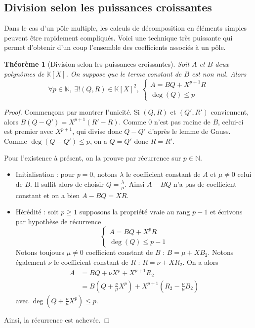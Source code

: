 \documentclass[french]{book}
\newcommand{\N}{\mathbb{N}}
\theoremstyle{plain}
\newtheorem{thm}{Théorème}[chapter]
\theoremstyle{definition}
\theoremstyle{remark}
\begin{document}
\subsection{Division selon les puissances croissantes}
Dans le cas d'un pôle multiple, les calculs de décomposition en éléments simples peuvent être rapidement compliqués. Voici une technique très puissante qui permet d'obtenir d'un coup l'ensemble des coefficients associés à un pôle.
\begin{thm}[Division selon les puissances croissantes]
	Soit $A$ et $B$ deux polynômes de $\mathbb{K}[X]$. On suppose que le terme constant de $B$ est non nul. Alors $$\forall p\in\mathbb{N},\ \exists!(Q,R)\in\mathbb{K}[X]^{2},\ \begin{cases}A=BQ+X^{p+1}R\\ \deg(Q)\le p\end{cases}$$
\end{thm}
\begin{proof}
	Commençons par montrer l'unicité. Si $(Q,R)$ et $(Q',R')$ conviennent, alors $B(Q-Q')=X^{p+1}(R'-R)$. Comme $0$ n'est pas racine de $B$, celui-ci est premier avec $X^{p+1}$, qui divise donc $Q-Q'$ d'après le lemme de Gauss. Comme $\deg(Q-Q')\leqslant p$, on a $Q=Q'$ donc $R=R'$. \\ \par Pour l'existence à présent, on la prouve par récurrence sur $p\in\N$.
	\begin{itemize}
		\item Initialisation : pour $p=0$, notons $\lambda$ le coefficient constant de $A$ et $\mu\neq 0$ celui de $B$. Il suffit alors de choisir $\displaystyle Q=\frac{\lambda}{\mu}$. Ainsi $A-BQ$ n'a pas de coefficient constant et on a bien $A-BQ=XR$.
		\item Hérédité : soit $p\geqslant 1$ supposons la propriété vraie au rang $p-1$ et écrivons par hypothèse de récurrence $$\begin{cases}A=BQ+X^{p}R\\ \deg(Q)\le p-1\end{cases}$$
		Notons toujours $\mu\neq 0$ coefficient constant de $B$ : $B=\mu+XB_{2}$. Notons également $\nu$ le coefficient constant de $R$ : $R=\nu+XR_{2}$. On a alors
		\begin{align*}
			A&=BQ+\nu X^{p}+X^{p+1}R_{2} \\
			&=B\left(Q+\frac{\nu}{\mu}X^{p}\right)+X^{p+1}\left(R_{2}-\frac{\nu}{\mu}B_{2}\right)
		\end{align*} avec $\displaystyle\deg\left(Q+\frac{\nu}{\mu}X^{p}\right)\leqslant p$.
	\end{itemize}
	Ainsi, la récurrence est achevée.
\end{proof}
\end{document}

